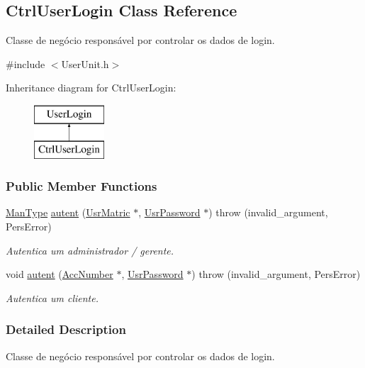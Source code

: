 \hypertarget{classCtrlUserLogin}{\subsection{Ctrl\-User\-Login Class Reference}
\label{d0/d43/classCtrlUserLogin}
}


Classe de negócio responsável por controlar os dados de login.  




{\ttfamily \#include $<$User\-Unit.\-h$>$}

Inheritance diagram for Ctrl\-User\-Login\-:\begin{figure}[H]
\begin{center}
\leavevmode
\includegraphics[height=2.000000cm]{d0/d43/classCtrlUserLogin}
\end{center}
\end{figure}
\subsubsection*{Public Member Functions}
\begin{DoxyCompactItemize}
\item 
\hyperlink{classUsrType}{Man\-Type} \hyperlink{classCtrlUserLogin_a023e4356e844e4824158ece586dbb07f}{autent} (\hyperlink{classUsrMatric}{Usr\-Matric} $\ast$, \hyperlink{classUsrPassword}{Usr\-Password} $\ast$)  throw (invalid\-\_\-argument, Pers\-Error)
\begin{DoxyCompactList}\small\item\em Autentica um administrador / gerente. \end{DoxyCompactList}\item 
void \hyperlink{classCtrlUserLogin_ae590a9174f5519037f92a7de7a2f9784}{autent} (\hyperlink{classAccNumber}{Acc\-Number} $\ast$, \hyperlink{classUsrPassword}{Usr\-Password} $\ast$)  throw (invalid\-\_\-argument, Pers\-Error)
\begin{DoxyCompactList}\small\item\em Autentica um cliente. \end{DoxyCompactList}\end{DoxyCompactItemize}


\subsubsection{Detailed Description}
Classe de negócio responsável por controlar os dados de login. 

